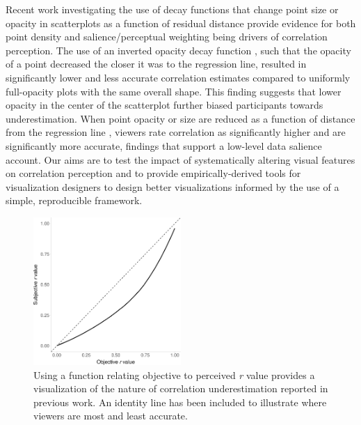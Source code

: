 \documentclass[sigconf]{acmart}
\begin{document}
Recent work investigating the use of decay functions that change point
size or opacity in scatterplots as a function of residual distance
provide evidence for both point density and salience/perceptual
weighting being drivers of correlation perception. The use of an
inverted opacity decay function \citep{strain_2023}, such that the
opacity of a point decreased the closer it was to the regression line,
resulted in significantly lower and less accurate correlation estimates
compared to uniformly full-opacity plots with the same overall shape.
This finding suggests that lower opacity in the center of the
scatterplot further biased participants towards underestimation. When
point opacity or size are reduced as a function of distance from the
regression line \citep{strain_2023, strain_2023b}, viewers rate
correlation as significantly higher and are significantly more accurate,
findings that support a low-level data salience account. Our aims are to
test the impact of systematically altering visual features on
correlation perception and to provide empirically-derived tools for
visualization designers to design better visualizations informed by the
use of a simple, reproducible framework.

\begin{figure}

\includegraphics[width=0.5\textwidth,height=\textheight]{size_and_opacity_files/figure-pdf/fig-underestimation-curve-1.pdf} \hfill{}

\caption{\label{fig-underestimation-curve}Using a function relating
objective to perceived \emph{r} value \citep{rensink_2017} provides a
visualization of the nature of correlation underestimation reported in
previous work. An identity line has been included to illustrate where
viewers are most and least accurate.}

\end{figure}
\end{document}
